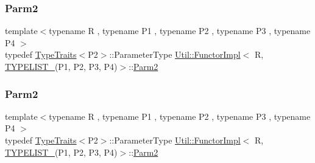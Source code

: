 \subsubsection{\texorpdfstring{Parm2}{Parm2}\hspace{0.1cm}{\footnotesize\ttfamily [1/2]}}
{\footnotesize\ttfamily template$<$typename R , typename P1 , typename P2 , typename P3 , typename P4 $>$ \\
typedef \mbox{\hyperlink{classUtil_1_1TypeTraits}{Type\+Traits}}$<$P2$>$\+::Parameter\+Type \mbox{\hyperlink{classUtil_1_1FunctorImpl}{Util\+::\+Functor\+Impl}}$<$ R, \mbox{\hyperlink{install_2include_2adat_2typelist_8h_a7a156c571ab21a16b0495e1c882a07fa}{T\+Y\+P\+E\+L\+I\+S\+T\+\_}}(P1, P2, P3, P4)$>$\+::\mbox{\hyperlink{structUtil_1_1Private_1_1FunctorImplBase_a554085cd798ef14838a59b528f0feb2e}{Parm2}}}

\mbox{\label{classUtil_1_1FunctorImpl_3_01R_00_01TYPELIST__4_07P1_00_01P2_00_01P3_00_01P4_08_4_aaf289567dfbd9f3379db79d06f02f4a7}} 
\subsubsection{\texorpdfstring{Parm2}{Parm2}\hspace{0.1cm}{\footnotesize\ttfamily [2/2]}}
{\footnotesize\ttfamily template$<$typename R , typename P1 , typename P2 , typename P3 , typename P4 $>$ \\
typedef \mbox{\hyperlink{classUtil_1_1TypeTraits}{Type\+Traits}}$<$P2$>$\+::Parameter\+Type \mbox{\hyperlink{classUtil_1_1FunctorImpl}{Util\+::\+Functor\+Impl}}$<$ R, \mbox{\hyperlink{install_2include_2adat_2typelist_8h_a7a156c571ab21a16b0495e1c882a07fa}{T\+Y\+P\+E\+L\+I\+S\+T\+\_}}(P1, P2, P3, P4)$>$\+::\mbox{\hyperlink{structUtil_1_1Private_1_1FunctorImplBase_a554085cd798ef14838a59b528f0feb2e}{Parm2}}}

\mbox{\label{classUtil_1_1FunctorImpl_3_01R_00_01TYPELIST__4_07P1_00_01P2_00_01P3_00_01P4_08_4_a50b605c92c54da7770a000867a97287a}} 
